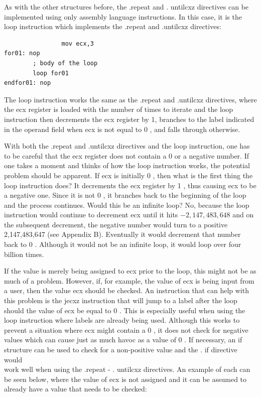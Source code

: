 \documentclass[10pt]{book}
\begin{document}
As with the other structures before, the .repeat and . untilcxz directives can be implemented using only assembly language instructions. In this case, it is the loop instruction which implements the .repeat and .untilcxz directives:

\begin{verbatim}
                mov ecx,3
for01: nop
        ; body of the loop
        loop for01
endfor01: nop
\end{verbatim}

The loop instruction works the same as the .repeat and .untilcxz directives, where the ecx register is loaded with the number of times to iterate and the loop instruction then decrements the ecx register by 1, branches to the label indicated in the operand field when ecx is not equal to 0 , and falls through otherwise.

With both the .repeat and .untilcxz directives and the loop instruction, one has to be careful that the ecx register does not contain a 0 or a negative number. If one takes a moment and thinks of how the loop instruction works, the potential problem should be apparent. If ecx is initially 0 , then what is the first thing the loop instruction does? It decrements the ecx register by 1 , thus causing ecx to be a negative one. Since it is not 0 , it branches back to the beginning of the loop and the process continues. Would this be an infinite loop? No, because the loop instruction would continue to decrement ecx until it hits $-2,147,483,648$ and on the subsequent decrement, the negative number would turn to a positive 2,147,483,647 (see Appendix B). Eventually it would decrement that number back to 0 . Although it would not be an infinite loop, it would loop over four billion times.

If the value is merely being assigned to ecx prior to the loop, this might not be as much of a problem. However, if, for example, the value of ecx is being input from a user, then the value ecx should be checked. An instruction that can help with this problem is the jecxz instruction that will jump to a label after the loop should the value of ecx be equal to 0 . This is especially useful when using the loop instruction where labels are already being used. Although this works to prevent a situation where ecx might contain a 0 , it does not check for negative values which can cause just as much havoc as a value of 0 . If necessary, an if structure can be used to check for a non-positive value and the . if directive would\\
work well when using the .repeat - . untilcxz directives. An example of each can be seen below, where the value of ecx is not assigned and it can be assumed to already have a value that needs to be checked:
\end{document}
